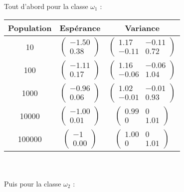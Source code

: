 \documentclass[a4paper,11pt]{article}
\begin{document}
\noindent Tout d'abord pour la classe $\omega_1$ : \\
\begin{center}
\begin{tabular}{|c|c|c|}
\hline
Population & Espérance & Variance  \\
\hline
10 & $\left (\begin{array}{ccc} -1.50 \\0.38\end{array}\right)$ & $ \begin{pmatrix}1.17&-0.11\\-0.11&0.72\end{pmatrix}$\\ 
100 &$\left (\begin{array}{ccc} -1.11 \\0.17\end{array}\right)$ & $ \begin{pmatrix}1.16&-0.06\\-0.06&1.04\end{pmatrix}$\\ 
1000 & $\left (\begin{array}{ccc} -0.96 \\0.06\end{array}\right)$ & $\begin{pmatrix}1.02&-0.01\\-0.01&0.93\end{pmatrix}$\\ 
10000 & $\left (\begin{array}{ccc} -1.00 \\0.01\end{array}\right)$ & $\begin{pmatrix}0.99&0\\0&1.01\end{pmatrix}$\\
100000 & $\left (\begin{array}{ccc} -1 \\0.00\end{array}\right)$ & $\begin{pmatrix}1.00&0\\0&1.01\end{pmatrix}$\\ 
\hline
\end{tabular}
\end{center}
\\ \\
\noindent Puis pour la classe $\omega_2$ : \\
\end{document}
